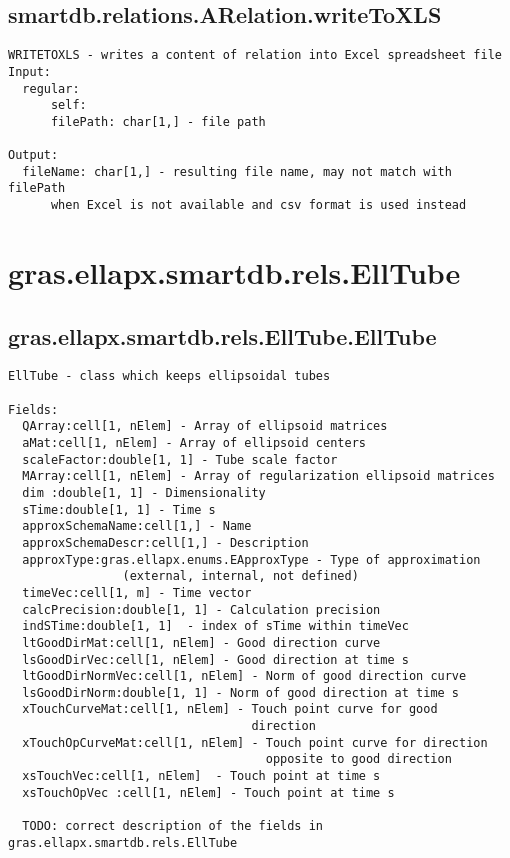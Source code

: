 \subsection{\texorpdfstring{smartdb.relations.ARelation.writeToXLS}{writeToXLS}}\label{method:smartdb.relations.ARelation.writeToXLS}
\begin{verbatim}
WRITETOXLS - writes a content of relation into Excel spreadsheet file
Input:
  regular:
      self:
      filePath: char[1,] - file path

Output:
  fileName: char[1,] - resulting file name, may not match with filePath
      when Excel is not available and csv format is used instead
\end{verbatim}
\section{gras.ellapx.smartdb.rels.EllTube}\label{secClassDescr:gras.ellapx.smartdb.rels.EllTube}
\subsection{\texorpdfstring{gras.ellapx.smartdb.rels.EllTube.EllTube}{EllTube}}\label{method:gras.ellapx.smartdb.rels.EllTube.EllTube}
\begin{verbatim}
EllTube - class which keeps ellipsoidal tubes

Fields:
  QArray:cell[1, nElem] - Array of ellipsoid matrices
  aMat:cell[1, nElem] - Array of ellipsoid centers
  scaleFactor:double[1, 1] - Tube scale factor
  MArray:cell[1, nElem] - Array of regularization ellipsoid matrices
  dim :double[1, 1] - Dimensionality
  sTime:double[1, 1] - Time s
  approxSchemaName:cell[1,] - Name
  approxSchemaDescr:cell[1,] - Description
  approxType:gras.ellapx.enums.EApproxType - Type of approximation
                (external, internal, not defined)
  timeVec:cell[1, m] - Time vector
  calcPrecision:double[1, 1] - Calculation precision
  indSTime:double[1, 1]  - index of sTime within timeVec
  ltGoodDirMat:cell[1, nElem] - Good direction curve
  lsGoodDirVec:cell[1, nElem] - Good direction at time s
  ltGoodDirNormVec:cell[1, nElem] - Norm of good direction curve
  lsGoodDirNorm:double[1, 1] - Norm of good direction at time s
  xTouchCurveMat:cell[1, nElem] - Touch point curve for good
                                  direction
  xTouchOpCurveMat:cell[1, nElem] - Touch point curve for direction
                                    opposite to good direction
  xsTouchVec:cell[1, nElem]  - Touch point at time s
  xsTouchOpVec :cell[1, nElem] - Touch point at time s

  TODO: correct description of the fields in gras.ellapx.smartdb.rels.EllTube
\end{verbatim}


